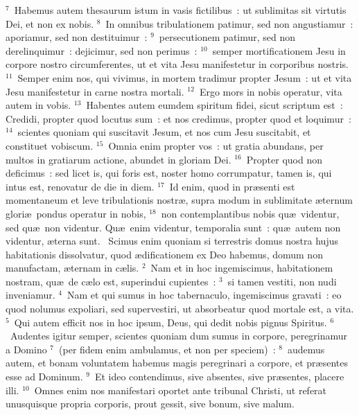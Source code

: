 ${}^{7}$~Habemus autem thesaurum istum in vasis fictilibus~: ut sublimitas sit virtutis Dei, et non ex nobis.
${}^{8}$~In omnibus tribulationem patimur, sed non angustiamur~: aporiamur, sed non destituimur~:
${}^{9}$~persecutionem patimur, sed non derelinquimur~: dejicimur, sed non perimus~:
${}^{10}$~semper mortificationem Jesu in corpore nostro circumferentes, ut et vita Jesu manifestetur in corporibus nostris.
${}^{11}$~Semper enim nos, qui vivimus, in mortem tradimur propter Jesum~: ut et vita Jesu manifestetur in carne nostra mortali.
${}^{12}$~Ergo mors in nobis operatur, vita autem in vobis.
${}^{13}$~Habentes autem eumdem spiritum fidei, sicut scriptum est~: Credidi, propter quod locutus sum~: et nos credimus, propter quod et loquimur~:
${}^{14}$~scientes quoniam qui suscitavit Jesum, et nos cum Jesu suscitabit, et constituet vobiscum.
${}^{15}$~Omnia enim propter vos~: ut gratia abundans, per multos in gratiarum actione, abundet in gloriam Dei.
${}^{16}$~Propter quod non deficimus~: sed licet is, qui foris est, noster homo corrumpatur, tamen is, qui intus est, renovatur de die in diem.
${}^{17}$~Id enim, quod in pr\ae senti est momentaneum et leve tribulationis nostr\ae , supra modum in sublimitate \ae ternum glori\ae\ pondus operatur in nobis,
${}^{18}$~non contemplantibus nobis qu\ae\ videntur, sed qu\ae\ non videntur. Qu\ae\ enim videntur, temporalia sunt~: qu\ae\ autem non videntur, \ae terna sunt.
~Scimus enim quoniam si terrestris domus nostra hujus habitationis dissolvatur, quod \ae dificationem ex Deo habemus, domum non manufactam, \ae ternam in c\ae lis.
${}^{2}$~Nam et in hoc ingemiscimus, habitationem nostram, qu\ae\ de c\ae lo est, superindui cupientes~:
${}^{3}$~si tamen vestiti, non nudi inveniamur.
${}^{4}$~Nam et qui sumus in hoc tabernaculo, ingemiscimus gravati~: eo quod nolumus expoliari, sed supervestiri, ut absorbeatur quod mortale est, a vita.
${}^{5}$~Qui autem efficit nos in hoc ipsum, Deus, qui dedit nobis pignus Spiritus.
${}^{6}$~Audentes igitur semper, scientes quoniam dum sumus in corpore, peregrinamur a Domino
${}^{7}$~(per fidem enim ambulamus, et non per speciem)~:
${}^{8}$~audemus autem, et bonam voluntatem habemus magis peregrinari a corpore, et pr\ae sentes esse ad Dominum.
${}^{9}$~Et ideo contendimus, sive absentes, sive pr\ae sentes, placere illi.
${}^{10}$~Omnes enim nos manifestari oportet ante tribunal Christi, ut referat unusquisque propria corporis, prout gessit, sive bonum, sive malum.


